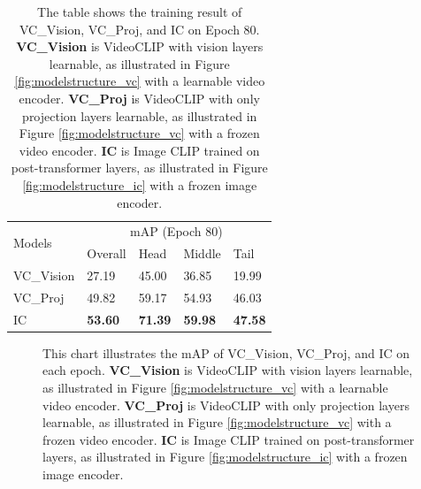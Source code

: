 \begin{table}[ht]
    \centering
    \caption[Training Results for Visual Encoder Selection on Epoch 80]{The table shows the training result of VC\_Vision, VC\_Proj, and IC on Epoch 80. \textbf{VC\_Vision} is VideoCLIP with vision layers learnable, as illustrated in Figure \ref{fig:modelstructure_vc} with a learnable video encoder. \textbf{VC\_Proj} is VideoCLIP with only projection layers learnable, as illustrated in Figure \ref{fig:modelstructure_vc} with a frozen video encoder. \textbf{IC} is Image CLIP trained on post-transformer layers, as illustrated in Figure \ref{fig:modelstructure_ic} with a frozen image encoder.}
    \label{tab:resultsbackbone}
    \begin{tabular}{lllll}
        \toprule
        \multirow{2}{*}{Models} & \multicolumn{4}{c}{mAP (Epoch 80)} \\
        \cmidrule{2-5} 
        {} & Overall & Head  & Middle & Tail \\
        \midrule
        VC\_Vision  & 27.19   & 45.00 & 36.85 & 19.99 \\
        VC\_Proj    & 49.82   & 59.17 & 54.93 & 46.03 \\
        IC          & \textbf{53.60} & \textbf{71.39} & \textbf{59.98} & \textbf{47.58} \\
        \bottomrule
    \end{tabular}
\end{table}

\begin{figure}[ht]
    \centering
    \resizebox{1.0\textwidth}{!}{}
    \caption[mAP of VC\_Vision, VC\_Proj, and IC on each Epoch]{This chart illustrates the mAP of VC\_Vision, VC\_Proj, and IC on each epoch. \textbf{VC\_Vision} is VideoCLIP with vision layers learnable, as illustrated in Figure \ref{fig:modelstructure_vc} with a learnable video encoder. \textbf{VC\_Proj} is VideoCLIP with only projection layers learnable, as illustrated in Figure \ref{fig:modelstructure_vc} with a frozen video encoder. \textbf{IC} is Image CLIP trained on post-transformer layers, as illustrated in Figure \ref{fig:modelstructure_ic} with a frozen image encoder.}
    \label{fig:tp_backbone}
\end{figure}


